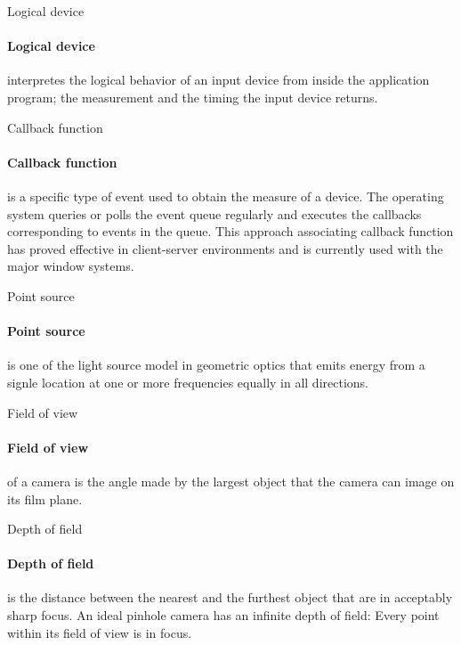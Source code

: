 \documentclass[10pt,a4paper]{article}
\begin{document}
\begin{enumerate}
		{\large \item Logical device}
			\paragraph{Logical device} interpretes the logical behavior of an input device from inside the application program; the measurement and the timing the input device returns.\\
			 
		{\large \item Callback function}
			\paragraph{Callback function} is a specific type of event used to obtain the measure of a device. The operating system queries or polls the event queue regularly and executes the callbacks corresponding to events in the queue. This approach associating callback function has proved effective in client-server environments and is currently used with the major window systems.\\
			
		{\large \item Point source}
			\paragraph{Point source} is one of the light source model in geometric optics that emits energy from a signle location at one or more frequencies equally in all directions.\\
			
		\pagebreak
		
		{\large \item Field of view}
			\paragraph{Field of view} of a camera is the angle made by the largest object that the camera can image on its film plane.\\
			
		{\large \item Depth of field}
			\paragraph{Depth of field} is the distance between the nearest and the furthest object that are in acceptably sharp focus. An ideal pinhole camera has an infinite depth of field: Every point within its field of view is in focus.\\
			

\end{enumerate}
\end{document}
